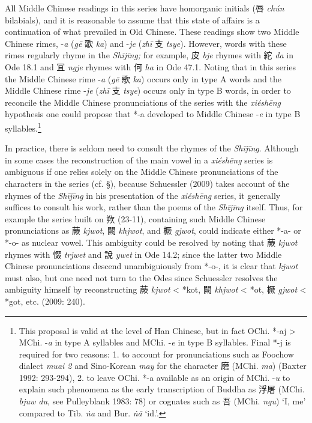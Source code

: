 All Middle Chinese readings in this series have homorganic initials (唇
 \emph{chún} bilabials), and it is reasonable to assume that this state
of affairs is a continuation of what prevailed in Old Chinese. These
readings show two Middle Chinese rimes, -\emph{a} (\emph{gē }歌
 \emph{ka}) and -\emph{je }(\emph{zhī }支  \emph{tsye}). However, words
with these rimes regularly rhyme in the \emph{Shījīng; }for example, 皮
 \emph{bje} rhymes with 紽 \emph{da} in Ode 18.1 and 冝  \emph{ngje}
rhymes with 何 \emph{ha} in Ode 47.1. Noting that in this series the
Middle Chinese rime -\emph{a} (\emph{gē }歌  \emph{ka}) occurs only in
type A words and the Middle Chinese rime -\emph{je} (\emph{zhī }支
 \emph{tsye}) occurs only in type B words, in order to reconcile the
Middle Chinese pronunciations of the series with the \emph{xiéshēng}
hypothesis one could propose that *-a developed to Middle Chinese
-\emph{e} in type B syllables.\footnote{This proposal is valid at the
  level of Han Chinese, but in fact OChi. *-aj \textgreater{} MChi.
  -\emph{a} in type A syllables and MChi. -\emph{e} in type B syllables.
  Final *-j is required for two reasons: 1. to account for
  pronunciations such as Foochow dialect  \emph{muai 2} and Sino-Korean
   \emph{may} for the character 磨 (MChi.  \emph{ma}) (Baxter 1992:
  293-294), 2. to leave OChi. *-a available as an origin of MChi.
  -\emph{u }to explain such phenomena as the early transcription of
  Buddha as 浮屠 (MChi.  \emph{bjuw du}, see Pulleyblank 1983: 78) or
  cognates such as 吾 (MChi. \emph{ngu}) `I, me' compared to Tib. {} \emph{ṅa} and Bur. {} \emph{ṅā} `id.'.}

In practice, there is seldom need to consult the rhymes of the
 \emph{Shījīng}. Although in some cases the reconstruction of the main
vowel in a \emph{xiéshēng} series is ambiguous if one relies solely on
the Middle Chinese pronunciations of the characters in the series (cf.
§), because Schuessler (2009) takes account of the rhymes of the
 \emph{Shījīng} in his presentation of the \emph{xiéshēng} series, it
generally suffices to consult his work, rather than the poems of the
 \emph{Shījīng} itself. Thus, for example the series built on 欮 (23-11),
containing such Middle Chinese pronunciations as 蕨 \emph{kjwot}, 闕
 \emph{khjwot}, and 橛 \emph{gjwot}, could indicate either *-a- or *-o-
as nuclear vowel. This ambiguity could be resolved by noting that 蕨
 \emph{kjwot} rhymes with 惙 \emph{trjwet} and 說 \emph{ywet} in Ode
14.2; since the latter two Middle Chinese pronunciations descend
unambiguiously from *-o-, it is clear that  \emph{kjwot} must also, but
one need not turn to the Odes since Schuessler resolves the ambiguity
himself by reconstructing 蕨 \emph{kjwot} \textless{} *kot, 闕
 \emph{khjwot} \textless{} *{}ot, 橛  \emph{gjwot} \textless{} *got, etc.
(2009: 240).

